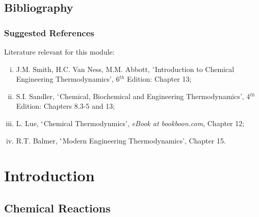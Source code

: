 \documentclass[10pt,compress,handout,unknownkeysallowed]{beamer}
\begin{document}
\subsection{Bibliography}
\begin{frame}
 \frametitle{Suggested References}
  Literature relevant for this module:
  \begin{enumerate}[(i)]
   \item\label{SVN_Book} J.M. Smith, H.C. Van Ness, M.M. Abbott, $\lq$Introduction to Chemical Engineering Thermodynamics', 6$^{th}$ Edition: Chapter 13;
   \item\label{Sandle_Book} S.I. Sandler, $\lq$Chemical, Biochemical and Engineering Thermodynamics', 4$^{th}$ Edition: Chapters 8.3-5 and 13;
   \item\label{Lue_Book} L. Lue, $\lq$Chemical Thermodynmics', {\it eBook at bookboon.com}, Chapter 12;
   \item\label{Balmer_Book}R.T. Balmer, $\lq$Modern Engineering Thermodynamics', Chapter 15.
  \end{enumerate}
\end{frame}


\section{Introduction}

\subsection{Chemical Reactions}
\end{document}
